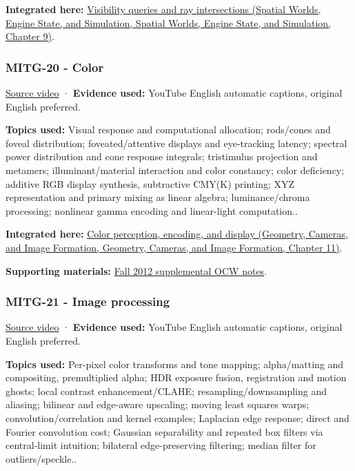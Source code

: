 \textbf{Integrated here:} \href{../05-Spatial-Worlds-Engine-State-and-Simulation/main.pdf\#nameddest=04-visual-computing-ii-ch028-visibility-queries-and-ray-intersections-1}{Visibility queries and ray intersections (Spatial Worlds, Engine State, and Simulation, Spatial Worlds, Engine State, and Simulation, Chapter 9)}.

\subsubsection{MITG-20 - Color}\label{04-visual-computing-ii-ch036-mitg-20---color}

\href{https://www.youtube.com/watch?v=aIVVBZ7cJBc}{Source video} · \textbf{Evidence used:} YouTube English automatic captions, original English preferred.

\textbf{Topics used:} Visual response and computational allocation; rods/cones and foveal distribution; foveated/attentive displays and eye-tracking latency; spectral power distribution and cone response integrals; tristimulus projection and metamers; illuminant/material interaction and color constancy; color deficiency; additive RGB display synthesis, subtractive CMY(K) printing; XYZ representation and primary mixing as linear algebra; luminance/chroma processing; nonlinear gamma encoding and linear-light computation..

\textbf{Integrated here:} \href{../03-Geometry-Cameras-and-Image-Formation/main.pdf\#nameddest=03-visual-computing-i-ch004-color-perception-encoding-and-display}{Color perception, encoding, and display (Geometry, Cameras, and Image Formation, Geometry, Cameras, and Image Formation, Chapter 11)}.

\textbf{Supporting materials:} \href{https://ocw.mit.edu/courses/6-837-computer-graphics-fall-2012/pages/lecture-notes/}{Fall 2012 supplemental OCW notes}.

\subsubsection{MITG-21 - Image processing}\label{04-visual-computing-ii-ch036-mitg-21---image-processing}

\href{https://www.youtube.com/watch?v=WWLxaVzkneI}{Source video} · \textbf{Evidence used:} YouTube English automatic captions, original English preferred.

\textbf{Topics used:} Per-pixel color transforms and tone mapping; alpha/matting and compositing, premultiplied alpha; HDR exposure fusion, registration and motion ghosts; local contrast enhancement/CLAHE; resampling/downsampling and aliasing; bilinear and edge-aware upscaling; moving least squares warps; convolution/correlation and kernel examples; Laplacian edge response; direct and Fourier convolution cost; Gaussian separability and repeated box filters via central-limit intuition; bilateral edge-preserving filtering; median filter for outliers/speckle..

